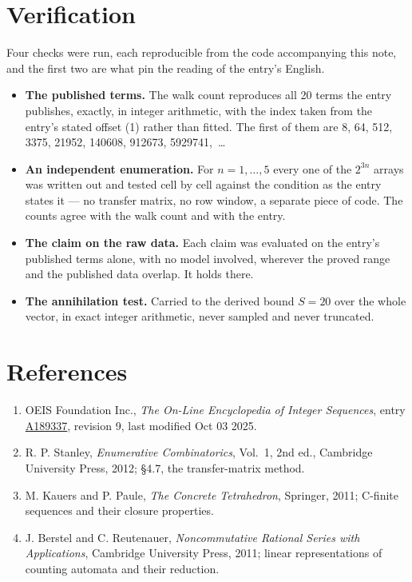 \documentclass[11pt]{article}
\theoremstyle{definition}
\begin{document}
\section{Verification}

Four checks were run, each reproducible from the code accompanying this note, and the first two are what pin the reading of the entry's English.

\begin{itemize}

\item {\bfseries The published terms.} The walk count reproduces all 20 terms the entry publishes, exactly, in integer arithmetic, with the index taken from the entry's stated offset (1) rather than fitted. The first of them are 8, 64, 512, 3375, 21952, 140608, 912673, 5929741,~\dots

\item {\bfseries An independent enumeration.} For $n = 1,\dots,5$ every one of the $2^{3n}$ arrays was written out and tested cell by cell against the condition as the entry states it --- no transfer matrix, no row window, a separate piece of code. The counts agree with the walk count and with the entry.

\item {\bfseries The claim on the raw data.} Each claim was evaluated on the entry's published terms alone, with no model involved, wherever the proved range and the published data overlap. It holds there.

\item {\bfseries The annihilation test.} Carried to the derived bound $S = 20$ over the whole vector, in exact integer arithmetic, never sampled and never truncated.

\end{itemize}

\section{References}

\begin{enumerate}

\item OEIS Foundation Inc., \emph{The On-Line Encyclopedia of Integer Sequences}, entry \href{https://oeis.org/A189337}{A189337}, revision 9, last modified Oct 03 2025.

\item R. P. Stanley, \emph{Enumerative Combinatorics}, Vol.~1, 2nd ed., Cambridge University Press, 2012; \S4.7, the transfer-matrix method.

\item M. Kauers and P. Paule, \emph{The Concrete Tetrahedron}, Springer, 2011; C-finite sequences and their closure properties.

\item J. Berstel and C. Reutenauer, \emph{Noncommutative Rational Series with Applications}, Cambridge University Press, 2011; linear representations of counting automata and their reduction.

\end{enumerate}
\end{document}
